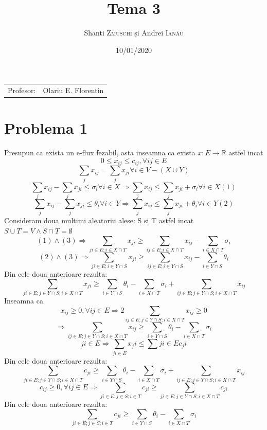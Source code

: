 \documentclass{article}
\title{Tema 3} %
\author{Shanti \textsc{Zmuschi} și Andrei \textsc{Ianău}} %
\date{10/01/2020}
\begin{document}
\maketitle %

\begin{center}
\begin{tabular}{l r}
Profesor: &  Olariu E. Florentin \\ %
\end{tabular}
\end{center}




\section*{Problema 1}
Presupun ca exista un e-flux fezabil, asta inseamna ca exista $x:E \rightarrow \mathbb{R}$ astfel incat \\
$$ 0 \leq x_{ij} \leq c_{ij}, \forall ij \in E$$
$$ \sum_{j}x_{ij} = \sum_{j}x_{ji} \forall i \in V-(X \cup Y) $$
$$ \sum_{j}x_{ij} -  \sum_{j}x_{ji}  \leq \sigma_i \forall i \in X \Rightarrow \sum_{j}x_{ij} \leq \sum_{j}x_{ji}  + \sigma_i \forall i \in X (1) $$
$$ \sum_{j}x_{ij} -  \sum_{j}x_{ji}  \leq \theta_i \forall i \in Y \Rightarrow \sum_{j}x_{ij} \leq \sum_{j}x_{ji}  + \theta_i \forall i \in Y (2) $$  
Consideram doua multimi aleatoriu alese: S si T astfel incat $S\cup T = V \land S \cap T = \emptyset$
$$(1)\land (3) \Rightarrow  \sum_{ji \in E; i \in X\cap T}x_{ji} \geq \sum_{ij \in E; i \in X\cap T}x_{ij} - \sum_{i \in X\cap T}\sigma_i $$ 
$$(2)\land (3) \Rightarrow  \sum_{ji \in E; i \in Y\cap S}x_{ji} \geq \sum_{ij \in E; i \in Y\cap S}x_{ij} - \sum_{i \in Y\cap S}\theta_i $$ 
Din cele doua anterioare rezulta:
$$ \sum_{ji \in E; j \in Y\cap S; i \in X\cap T}x_{ji} \geq  \sum_{i \in Y\cap S}\theta_i - \sum_{i \in X\cap T}\sigma_i +  \sum_{ij \in E; j \in Y\cap S; i \in X\cap T}x_{ij}$$ 
Inseamna ca 
$$ x_{ij} \geq 0, \forall ij \in E \Rightarrow 2  \sum_{ij \in E; j \in Y\cap S; i \in X\cap T}x_{ij} \geq 0$$
$$\Rightarrow \sum_{ij \in E; j \in Y\cap S; i \in X\cap T}x_{ij} \geq \sum_{i \in Y\cap S}\theta_i - \sum_{i \in X\cap T}\sigma_i   $$
$$ ji \in E \Rightarrow \sum_{ji \in E}{x_ji} \leq \sum{ji \in E}{c_ji} $$
Din cele doua anterioare rezulta:
$$ \sum_{ji \in E; j \in Y\cap S; i \in X\cap T}c_{ji} \geq  \sum_{i \in Y\cap S}\theta_i - \sum_{i \in X\cap T}\sigma_i +  \sum_{ij \in E; j \in Y\cap S; i \in X\cap T}x_{ij}$$ 
$$ c_{ij} \geq 0, \forall ij \in E \Rightarrow  \sum_{ji \in E; j \in  S; i \in T}c_{ji} \geq \sum_{ji \in E; j \in Y\cap S; i \in X\cap T}c_{ji} $$
Din cele doua anterioare rezulta:
$$ \sum_{ji \in E; j \in  S; i \in T}c_{ji} \geq \sum_{i \in Y\cap S}\theta_i -  \sum_{i \in X\cap T}\sigma_i $$
\end{document}
